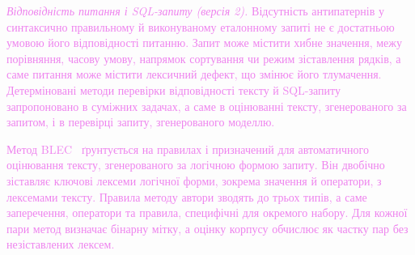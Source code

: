 \documentclass[a4paper,14pt,oneside]{extreport}
\begin{document}
\textit{\textcolor{violet}{Відповідність питання і SQL-запиту (версія 2).}}
\textcolor{violet}{Відсутність антипатернів у синтаксично правильному й виконуваному еталонному запиті не є достатньою умовою його відповідності питанню. Запит може містити хибне значення, межу порівняння, часову умову, напрямок сортування чи режим зіставлення рядків, а саме питання може містити лексичний дефект, що змінює його тлумачення. Детерміновані методи перевірки відповідності тексту й SQL-запиту запропоновано в суміжних задачах, а саме в оцінюванні тексту, згенерованого за запитом, і в перевірці запиту, згенерованого моделлю.}

\textcolor{violet}{Метод BLEC~\cite{shu2021blec} ґрунтується на правилах і призначений для автоматичного оцінювання тексту, згенерованого за логічною формою запиту. Він двобічно зіставляє ключові лексеми логічної форми, зокрема значення й оператори, з лексемами тексту. Правила методу автори зводять до трьох типів, а саме заперечення, оператори та правила, специфічні для окремого набору. Для кожної пари метод визначає бінарну мітку, а оцінку корпусу обчислює як частку пар без незіставлених лексем.}
\end{document}
